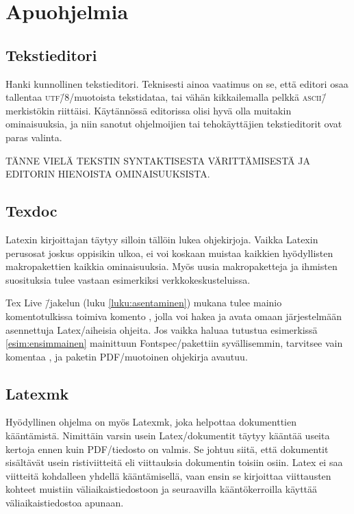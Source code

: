 \section{Apuohjelmia}

\subsection{Tekstieditori}

Hanki kunnollinen teksti\-editori. Teknisesti ainoa vaatimus on se, että
editori osaa tallentaa \textsc{utf}\=/8\-/muotoista tekstidataa, tai
vähän kikkailemalla pelkkä \textsc{ascii}\=/merkistökin riittäisi.
Käytännössä editorissa olisi hyvä olla muitakin ominaisuuksia, ja niin
sanotut ohjelmoijien tai tehokäyttäjien teksti\-editorit ovat paras
valinta.

TÄNNE VIELÄ TEKSTIN SYNTAKTISESTA VÄRITTÄMISESTÄ JA EDITORIN HIENOISTA
OMINAISUUKSISTA.

\subsection{Texdoc}

Latexin kirjoittajan täytyy silloin tällöin lukea ohjekirjoja. Vaikka
Latexin perus\-osat joskus oppisikin ulkoa, ei voi koskaan muistaa
kaikkien hyödyllisten makropakettien kaikkia ominaisuuksia. Myös uusia
makropaketteja ja ihmisten suosituksia tulee vastaan esimerkiksi
verkkokeskusteluissa.

Tex Live \=/jakelun (luku \ref{luku:asentaminen}) mukana tulee mainio
komentotulkissa toimiva komento , jolla voi hakea ja avata
omaan järjestelmään asennettuja Latex\-/aiheisia ohjeita. Jos vaikka
haluaa tutustua esimerkissä \ref{esim:ensimmainen} mainittuun
Fontspec\-/pakettiin syvällisemmin, tarvitsee vain komentaa
, ja paketin PDF\-/muotoinen ohjekirja avautuu.

\subsection{Latexmk}

Hyödyllinen ohjelma on myös Latexmk, joka helpottaa dokumenttien
kääntämistä. Nimittäin varsin usein Latex\-/dokumentit täytyy kääntää
useita kertoja ennen kuin PDF\-/tiedosto on valmis. Se johtuu siitä,
että dokumentit sisältävät usein ristiviitteitä eli viittauksia
dokumentin toisiin osiin. Latex ei saa viitteitä kohdalleen yhdellä
kääntämisellä, vaan ensin se kirjoittaa viittausten kohteet muistiin
väli\-aikais\-tiedostoon ja seuraavilla kääntökerroilla käyttää
väli\-aikais\-tiedostoa apunaan.

